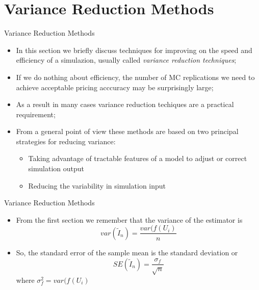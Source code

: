 \documentclass[11pt]{beamer}
\begin{document}
\section{Variance Reduction Methods}
\begin{frame}{Variance Reduction Methods}
\begin{itemize}
\item In this section we briefly discuss techniques for improving on the speed and efficiency of a simulazion, usually called \textit{variance reduction techniques};
\item  If we do nothing about efficiency, the number of MC replications we need to achieve acceptable pricing acccuracy may be surprisingly large;
\item As a result in many cases variance reduction techiques are a practical requirement;
\item From a general point of view these methods are based on two principal strategies for reducing variance:
\begin{itemize}

\item Taking advantage of tractable features of a model to adjust or correct simulation output
\item Reducing the variability in simulation input

\end{itemize}

\end{itemize}
\end{frame}
\begin{frame}{Variance Reduction Methods}
\begin{itemize}
\item From the first section we remember that the variance of the estimator is
$$ var \left( \tilde{I}_n \right) = \frac{var(f(U_i)}{n} $$
\item  So, the standard error of the sample mean is the standard deviation or
$$ SE  \left( \tilde{I}_n \right) = \frac{\sigma_f}{\sqrt{n}}$$
where $\sigma^2_f = var(f(U_i)$
\end{itemize}
\end{frame}
\end{document}
